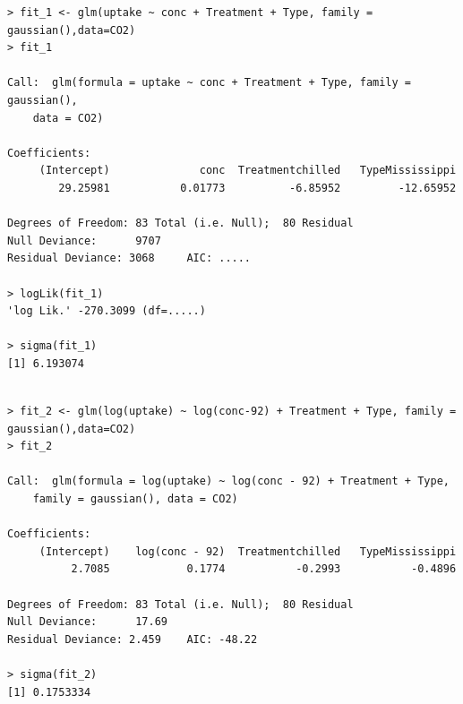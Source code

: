 \documentclass[11pt,a4paper%
addpoints, 
answers%
]{exam}
\begin{document}
\begin{center}
\begin{verbatim}
> fit_1 <- glm(uptake ~ conc + Treatment + Type, family = gaussian(),data=CO2)
> fit_1

Call:  glm(formula = uptake ~ conc + Treatment + Type, family = gaussian(), 
    data = CO2)

Coefficients:
     (Intercept)              conc  Treatmentchilled   TypeMississippi  
        29.25981           0.01773          -6.85952         -12.65952  

Degrees of Freedom: 83 Total (i.e. Null);  80 Residual
Null Deviance:	    9707 
Residual Deviance: 3068 	AIC: .....

> logLik(fit_1)
'log Lik.' -270.3099 (df=.....)

> sigma(fit_1)
[1] 6.193074

\end{verbatim}
\end{center}


\begin{center}
\begin{verbatim}

> fit_2 <- glm(log(uptake) ~ log(conc-92) + Treatment + Type, family = gaussian(),data=CO2)
> fit_2

Call:  glm(formula = log(uptake) ~ log(conc - 92) + Treatment + Type, 
    family = gaussian(), data = CO2)

Coefficients:
     (Intercept)    log(conc - 92)  Treatmentchilled   TypeMississippi  
          2.7085            0.1774           -0.2993           -0.4896  

Degrees of Freedom: 83 Total (i.e. Null);  80 Residual
Null Deviance:	    17.69 
Residual Deviance: 2.459 	AIC: -48.22

> sigma(fit_2)
[1] 0.1753334

\end{verbatim} 
\end{center}
\end{document}
